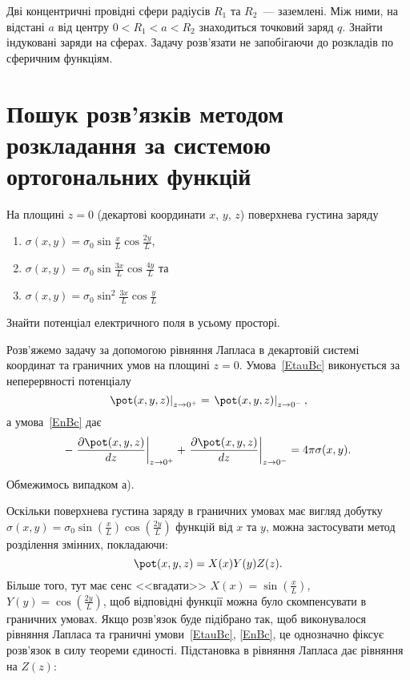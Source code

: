 \begin{problem}
Дві концентричні провідні сфери радіусів  $R_1$ та $R_2$~--- заземлені. Між ними, на відстані $a$  від центру $0< R_1<a<R_2$  знаходиться точковий заряд  $q$. Знайти індуковані заряди на сферах. Задачу розв'язати не запобігаючи до розкладів по сферичним функціям.
\end{problem}

\section{Пошук розв'язків методом розкладання за системою ортогональних функцій}
\begin{problem}\label{prb:charged_plates}
На площині $z=0$ (декартові координати $x$, $y$, $z$) поверхнева густина заряду
\begin{enumerate}[label=\alph*)]
	\item $\sigma(x, y) = \sigma_0 \sin\frac{x}{L}\cos\frac{2y}{L}$,
	\item  $\sigma(x, y) = \sigma_0 \sin\frac{3x}{L}\cos\frac{4y}{L}$ та
	\item  $\sigma(x, y) = \sigma_0 \sin^2\frac{3x}{L}\cos\frac{y}{L}$
\end{enumerate}
Знайти потенціал електричного поля в усьому просторі.
\begin{solution}
    Розв'яжемо задачу за допомогою рівняння Лапласа в декартовій системі координат  та граничних умов на площині $z = 0$. Умова~\eqref{EtauBc} виконується за неперервності потенціалу
	\begin{equation*}\label{continuity}
		\left.\pot(x,y,z)\right|_{z \to 0^+} = \left.\pot(x,y,z)\right|_{z \to 0^-},
	\end{equation*}
	а умова~\eqref{EnBc} дає 
	\begin{equation*}\label{boundary}
		-\left. \frac{\partial \pot(x,y,z)}{dz}\right|_{z \to 0^+} + \left. \frac{\partial \pot(x,y,z)}{dz}\right|_{z \to 0^-} =4\pi\sigma(x,y).
	\end{equation*}

	Обмежимось випадком а).

	Оскільки поверхнева густина заряду в граничних умовах має вигляд добутку $\sigma(x, y) = \sigma_0 \sin\left( \frac{x}{L}\right) \cos\left( \frac{2y}{L}\right) $ функцій від $x$ та $y$, можна застосувати метод розділення змінних, покладаючи:
    \[
        \pot(x,y,z) = X(x)Y(y)Z(z).
    \]
Більше того, тут має сенс <<вгадати>> $X(x) = \sin\left(\frac{x}{L}\right) $, $Y(y) = \cos\left(\frac{2y}{L}\right) $, щоб відповідні функції можна було скомпенсувати в граничних умовах. Якщо розв’язок буде підібрано так, щоб виконувалося рівняння Лапласа та граничні умови~\eqref{EtauBc}, \eqref{EnBc}, це однозначно фіксує розв'язок в силу теореми єдиності. Підстановка в рівняння Лапласа дає рівняння на $Z(z)$:


\end{solution}
\end{problem}
